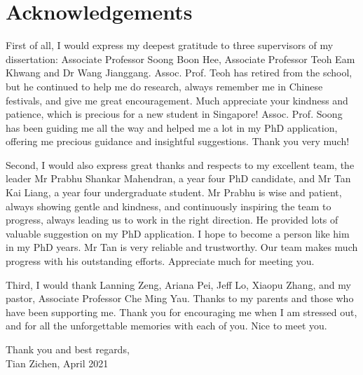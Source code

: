 \chapter*{\centering Acknowledgements}
\begin{spacing}{1.4}
\setlength{\parskip}{0.3in}

First of all, I would express my deepest gratitude to three supervisors of my dissertation: Associate Professor Soong Boon Hee, Associate Professor Teoh Eam Khwang and Dr Wang Jianggang. Assoc. Prof. Teoh has retired from the school, but he continued to help me do research, always remember me in Chinese festivals, and give me great encouragement. Much appreciate your kindness and patience, which is precious for a new student in Singapore! Assoc. Prof. Soong has been guiding me all the way and helped me a lot in my PhD application, offering me precious guidance and insightful suggestions. Thank you very much!

Second, I would also express great thanks and respects to my excellent team, the leader Mr Prabhu Shankar Mahendran, a year four PhD candidate, and Mr Tan Kai Liang, a year four undergraduate student. Mr Prabhu is wise and patient, always showing gentle and kindness, and continuously inspiring the team to progress, always leading us to work in the right direction. He provided lots of valuable suggestion on my PhD application. I hope to become a person like him in my PhD years. Mr Tan is very reliable and trustworthy. Our team makes much progress with his outstanding efforts. Appreciate much for meeting you.

Third, I would thank Lanning Zeng, Ariana Pei, Jeff Lo, Xiaopu Zhang, and my pastor, Associate Professor Che Ming Yau. Thanks to my parents and those who have been supporting me. Thank you for encouraging me when I am stressed out, and for all the unforgettable memories with each of you. Nice to meet you.

Thank you and best regards,\\
Tian Zichen, April 2021

\end{spacing}
\newpage
